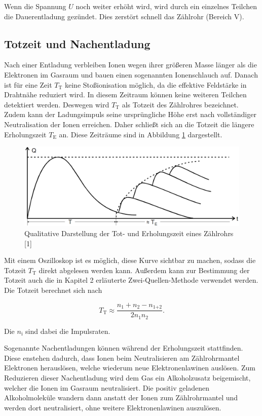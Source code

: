 Wenn die Spannung $U$ noch weiter erhöht wird, wird durch ein einzelnes Teilchen 
die Dauerentladung gezündet. Dies zerstört schnell das Zählrohr (Bereich V). 

\subsection{Totzeit und Nachentladung}

Nach einer Entladung verbleiben Ionen wegen ihrer größeren Masse länger als 
die Elektronen im Gasraum und bauen einen sogenannten Ionenschlauch auf. 
Danach ist für eine Zeit $T_\text{T}$ keine Stoßionisation möglich, da die 
effektive Feldstärke in Drahtnähe reduziert wird. In diesem Zeitraum können 
keine weiteren Teilchen detektiert werden. Deswegen wird $T_\text{T}$ als 
Totzeit des Zählrohres bezeichnet. Zudem kann der Ladungsimpuls seine 
ursprüngliche Höhe erst nach vollständiger Neutralisation der Ionen erreichen. 
Daher schließt sich an die Totzeit die längere Erholungszeit $T_\text{E}$ 
an. Diese Zeiträume sind in Abbildung \ref{fig:Totzeit} dargestellt. 

\begin{figure}
  \centering
  \includegraphics[scale=0.3]{content/Totzeit.png}
  \caption{Qualitative Darstellung der Tot- und Erholungszeit eines Zählrohrs [1]}
  \label{fig:Totzeit}
\end{figure}

Mit einem Oszilloskop ist es möglich, diese Kurve sichtbar zu machen, sodass die
Totzeit $T_\text{T}$ direkt abgelesen werden kann. Außerdem kann zur Bestimmung 
der Totzeit auch die in Kapitel 2 erläuterte Zwei-Quellen-Methode verwendet werden. 
Die Totzeit berechnet sich nach 

\begin{equation}
T_\text{T} \approx \frac{n_1+n_2-n_\text{1+2}}{2n_1n_2}.
\label{eqn:totzeit}
\end{equation}

Die $n_\text{i}$ sind dabei die Impulsraten.

Sogenannte Nachentladungen können während der Erholungszeit stattfinden. Diese 
enstehen dadurch, dass Ionen beim Neutralisieren am Zählrohrmantel Elektronen 
herauslösen, welche wiederum neue Elektronenlawinen auslösen. Zum Reduzieren 
dieser Nachentladung wird dem Gas ein Alkoholzusatz beigemischt, welcher die 
Ionen im Gasraum neutralisiert. Die positiv geladenen Alkoholmoleküle wandern
dann anstatt der Ionen zum Zählrohrmantel und werden dort neutralisiert, ohne 
weitere Elektronenlawinen auszulösen. 